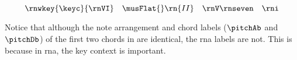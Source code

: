 \begin{equation}
    \label{eq:succession2}
    \rnwkey{\keyc}{\rnVI} \quad \musFlat{}\rn{II} \quad \rnV\rnseven \quad \rni
\end{equation}

Notice that although the note arrangement and chord labels
($\pitchAb$ and $\pitchDb$) of the first two chords in
 are identical, the
\gls{rna} labels are not. This is because in \gls{rna}, the
key context is important.

